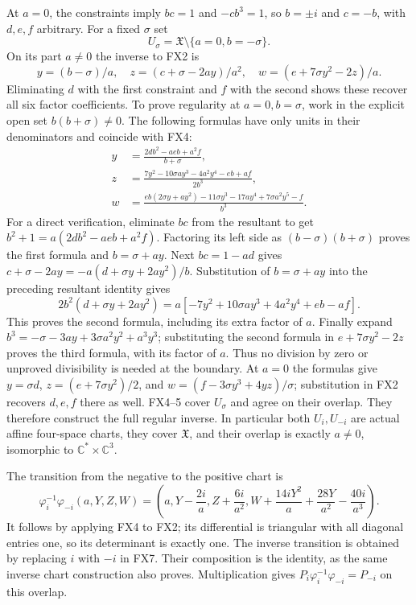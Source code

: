 \documentclass[11pt]{article}
\newcommand{\C}{\mathbb C}
\begin{document}
At $a=0$, the constraints imply $bc=1$ and $-cb^3=1$,
so $b=\pm i$ and $c=-b$, with $d,e,f$ arbitrary. For a fixed
$\sigma$ set
\[
 U_\sigma=\mathfrak X\setminus\{a=0,b=-\sigma\}.
 \tag{FX3}
\]
On its part $a\ne0$ the inverse to FX2 is
\[
 y=(b-\sigma)/a,\quad
 z=(c+\sigma-2ay)/a^2,\quad
 w=(e+7\sigma y^2-2z)/a. \tag{FX4}
\]
Eliminating $d$ with the first constraint and $f$ with the second
shows these recover all six factor coefficients.
To prove regularity at $a=0,b=\sigma$, work in the explicit open
set $b(b+\sigma)\ne0$. The following formulas have only units
in their denominators and coincide with FX4:
\[
 \begin{aligned}
 y&=\frac{2db^2-aeb+a^2f}{b+\sigma},\\
 z&=\frac{7y^2-10\sigma ay^3-4a^2y^4-eb+af}{2b^3},\\
 w&=\frac{eb(2\sigma y+ay^2)-11\sigma y^3-17ay^4
                                      +7\sigma a^2y^5-f}{b^3}.
 \end{aligned} \tag{FX5}
\]
For a direct verification, eliminate $bc$ from the resultant to
get $b^2+1=a(2db^2-aeb+a^2f)$. Factoring its left side as
$(b-\sigma)(b+\sigma)$ proves the first formula and
$b=\sigma+ay$. Next $bc=1-ad$ gives
$c+\sigma-2ay=-a(d+\sigma y+2ay^2)/b$.
Substitution of $b=\sigma+ay$ into the preceding resultant
identity gives
\[
 2b^2(d+\sigma y+2ay^2)
 =a[-7y^2+10\sigma ay^3+4a^2y^4+eb-af].
 \tag{FX6}
\]
This proves the second formula, including its extra factor of $a$.
Finally expand $b^3=-\sigma-3ay+3\sigma a^2y^2+a^3y^3$;
substituting the second formula in $e+7\sigma y^2-2z$ proves
the third formula, with its factor of $a$. Thus no division by
zero or unproved divisibility is needed at the boundary.
At $a=0$ the formulas give
$y=\sigma d$, $z=(e+7\sigma y^2)/2$, and
$w=(f-3\sigma y^3+4yz)/\sigma$; substitution in FX2 recovers
$d,e,f$ there as well. FX4--5 cover $U_\sigma$ and agree on
their overlap. They therefore construct the full regular inverse.
In particular both $U_i,U_{-i}$ are actual affine four-space
charts, they cover $\mathfrak X$, and their overlap is exactly
$a\ne0$, isomorphic to $\C^*\times\C^3$.

The transition from the negative to the positive chart is
\[
 \varphi_i^{-1}\varphi_{-i}(a,Y,Z,W)
 =\left(a,Y-\frac{2i}{a},Z+\frac{6i}{a^2},
 W+\frac{14iY^2}{a}+\frac{28Y}{a^2}-\frac{40i}{a^3}\right).
 \tag{FX7}
\]
It follows by applying FX4 to FX2; its differential is triangular
with all diagonal entries one, so its determinant is exactly one.
The inverse transition is obtained by replacing $i$ with $-i$
in FX7. Their composition is the identity, as the same inverse
chart construction also proves. Multiplication gives
$P_i\varphi_i^{-1}\varphi_{-i}=P_{-i}$ on this overlap.
\end{document}
